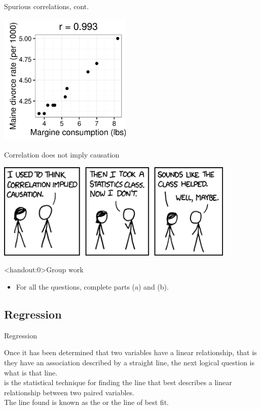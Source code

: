 \documentclass[xcolor=table, handout]{beamer}
\begin{document}
\begin{frame}{Spurious correlations, cont.}
\bigskip
{\centering
\includegraphics[width=2.5in]{../images/ch10_cor_spur2}
\par}

\end{frame}


\begin{frame}{Correlation does not imply causation}

{\centering
\includegraphics[width=4.5in]{../images/ch10_correlation}
\par}
\end{frame}

\begin{frame}<handout:0>{Group work}
\begin{block}{}
\large
\begin{itemize}
\item For all the questions, complete parts (a) and (b).
\end{itemize}
\end{block}
\end{frame}


\subsection{Regression}

\begin{frame}{Regression}
\begin{block}{}
\large
Once it has been determined that two variables have a linear relationship, that is they have an association described by a straight line, the next logical question is what is that line.\\
\pause\medskip
{} is the statistical technique for finding the line that best describes a linear relationship between two paired variables.\\
\pause\medskip
The line found is known as the  or the line of best fit.
\end{block}
\end{frame}
\end{document}

